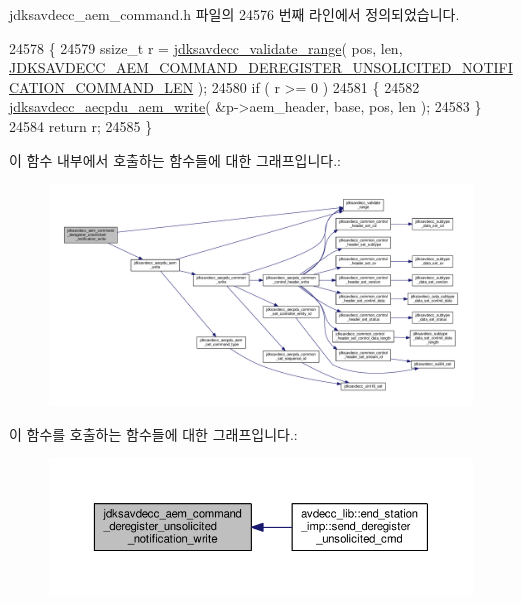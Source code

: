 jdksavdecc\+\_\+aem\+\_\+command.\+h 파일의 24576 번째 라인에서 정의되었습니다.


\begin{DoxyCode}
24578 \{
24579     ssize\_t r = \hyperlink{group__util_ga9c02bdfe76c69163647c3196db7a73a1}{jdksavdecc\_validate\_range}( pos, len, 
      \hyperlink{group__command__deregister__unsolicited__notification_ga09edf0f352ed57aaf985b0426a11f09a}{JDKSAVDECC\_AEM\_COMMAND\_DEREGISTER\_UNSOLICITED\_NOTIFICATION\_COMMAND\_LEN}
       );
24580     \textcolor{keywordflow}{if} ( r >= 0 )
24581     \{
24582         \hyperlink{group__aecpdu__aem_gad658e55771cce77cecf7aae91e1dcbc5}{jdksavdecc\_aecpdu\_aem\_write}( &p->aem\_header, base, pos, len );
24583     \}
24584     \textcolor{keywordflow}{return} r;
24585 \}
\end{DoxyCode}


이 함수 내부에서 호출하는 함수들에 대한 그래프입니다.\+:
\nopagebreak
\begin{figure}[H]
\begin{center}
\leavevmode
\includegraphics[width=350pt]{group__command__deregister__unsolicited__notification_gafb4ff40967ee883562fc3460d80397c4_cgraph}
\end{center}
\end{figure}




이 함수를 호출하는 함수들에 대한 그래프입니다.\+:
\nopagebreak
\begin{figure}[H]
\begin{center}
\leavevmode
\includegraphics[width=350pt]{group__command__deregister__unsolicited__notification_gafb4ff40967ee883562fc3460d80397c4_icgraph}
\end{center}
\end{figure}



